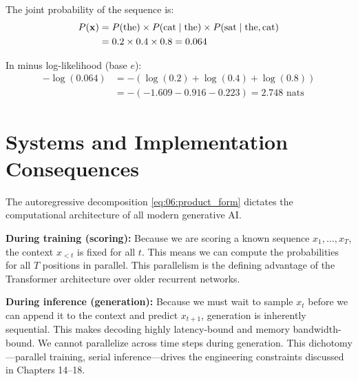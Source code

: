 The joint probability of the sequence is:
\begin{align*}
    P(\mathbf{x}) &= P(\text{the}) \times P(\text{cat} \mid \text{the}) \times P(\text{sat} \mid \text{the}, \text{cat}) \\
           &= 0.2 \times 0.4 \times 0.8 = 0.064
\end{align*}

In minus log-likelihood (base $e$):
\begin{align*}
    -\log(0.064) &= - (\log(0.2) + \log(0.4) + \log(0.8)) \\
                 &= - (-1.609 - 0.916 - 0.223) = 2.748 \text{ nats}
\end{align*}

\section{Systems and Implementation Consequences}
\label{ch:06:sec:systems}

The autoregressive decomposition \cref{eq:06:product_form} dictates the computational architecture of all modern generative AI. 

\textbf{During training (scoring):} Because we are scoring a known sequence $x_1, \dots, x_T$, the context $x_{<t}$ is fixed for all $t$. This means we can compute the probabilities for all $T$ positions in parallel. This parallelism is the defining advantage of the Transformer architecture over older recurrent networks.

\textbf{During inference (generation):} Because we must wait to sample $x_t$ before we can append it to the context and predict $x_{t+1}$, generation is inherently sequential. This makes decoding highly latency-bound and memory bandwidth-bound. We cannot parallelize across time steps during generation. This dichotomy---parallel training, serial inference---drives the engineering constraints discussed in Chapters 14–18.

